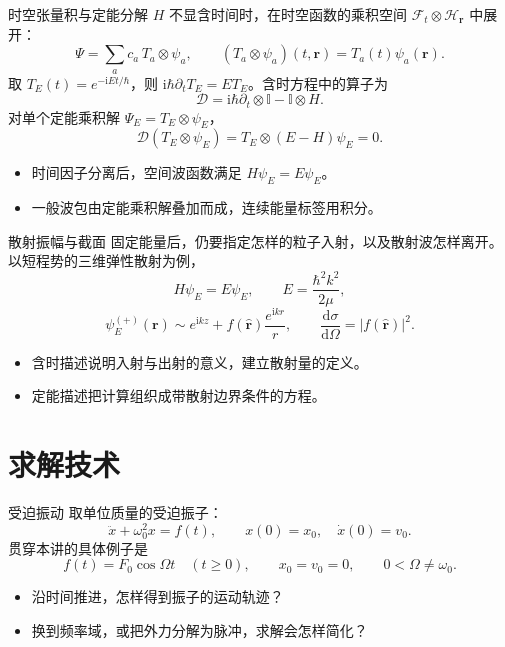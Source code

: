 \documentclass[aspectratio=169,11pt]{beamer}
\newcommand{\dd}{\mathrm d}
\newcommand{\ii}{\mathrm i}
\newcommand{\id}{\mathbb I}
\begin{document}
\begin{frame}{时空张量积与定能分解}
$H$ 不显含时间时，在时空函数的乘积空间 $\mathcal F_t\otimes\mathcal H_{\bm r}$ 中展开：
\[
\Psi=\sum_a c_a\,T_a\otimes\psi_a,\qquad
(T_a\otimes\psi_a)(t,\bm r)=T_a(t)\psi_a(\bm r).
\]
取 $T_E(t)=e^{-\ii Et/\hbar}$，则 $\ii\hbar\partial_tT_E=ET_E$。含时方程中的算子为
\[
\mathcal D=\ii\hbar\partial_t\otimes\id-\id\otimes H.
\]
对单个定能乘积解 $\Psi_E=T_E\otimes\psi_E$，
\[
\mathcal D(T_E\otimes\psi_E)=T_E\otimes(E-H)\psi_E=0.
\]
\begin{itemize}
\item 时间因子分离后，空间波函数满足 $H\psi_E=E\psi_E$。
\item 一般波包由定能乘积解叠加而成，连续能量标签用积分。
\end{itemize}
\end{frame}

\begin{frame}{散射振幅与截面}
固定能量后，仍要指定怎样的粒子入射，以及散射波怎样离开。
以短程势的三维弹性散射为例，
\[
H\psi_E=E\psi_E,\qquad E=\frac{\hbar^2k^2}{2\mu},
\]
\[
\psi_E^{(+)}(\bm r)\sim e^{\ii kz}
+f(\hat{\bm r})\frac{e^{\ii kr}}{r},
\qquad \frac{\dd\sigma}{\dd\Omega}=|f(\hat{\bm r})|^2.
\]
\begin{itemize}
\item 含时描述说明入射与出射的意义，建立散射量的定义。
\item 定能描述把计算组织成带散射边界条件的方程。
\end{itemize}
\end{frame}

\section{求解技术}

\begin{frame}{受迫振动}
取单位质量的受迫振子：
\[
\ddot x+\omega_0^2x=f(t),\qquad x(0)=x_0,\quad\dot x(0)=v_0.
\]
贯穿本讲的具体例子是
\[
f(t)=F_0\cos\Omega t\quad(t\ge0),\qquad
x_0=v_0=0,\qquad 0<\Omega\ne\omega_0.
\]
\begin{itemize}
\item 沿时间推进，怎样得到振子的运动轨迹？
\item 换到频率域，或把外力分解为脉冲，求解会怎样简化？
\end{itemize}
\end{frame}
\end{document}
